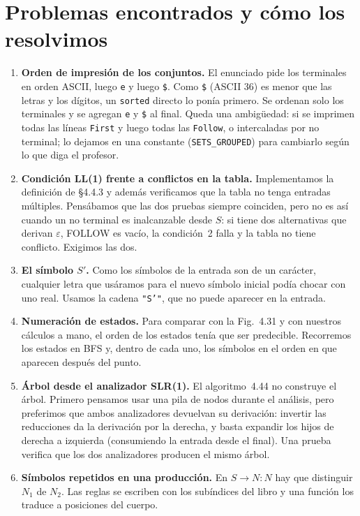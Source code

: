 \documentclass[11pt,a4paper]{article}
\newcommand{\eps}{\varepsilon}
\newcommand{\code}[1]{\texttt{#1}}
\begin{document}
\section{Problemas encontrados y cómo los resolvimos}
\begin{enumerate}
\item \textbf{Orden de impresión de los conjuntos.} El enunciado pide los terminales en orden
ASCII, luego \code{e} y luego \code{\$}. Como \code{\$} (ASCII 36) es menor que las letras y los
dígitos, un \code{sorted} directo lo ponía primero. Se ordenan solo los terminales y se agregan
\code{e} y \code{\$} al final. Queda una ambigüedad: si se imprimen todas las líneas
\code{First} y luego todas las \code{Follow}, o intercaladas por no terminal; lo dejamos en una
constante (\code{SETS\_GROUPED}) para cambiarlo según lo que diga el profesor.
\item \textbf{Condición LL(1) frente a conflictos en la tabla.} Implementamos la definición de
§4.4.3 y además verificamos que la tabla no tenga entradas múltiples. Pensábamos que las dos
pruebas siempre coinciden, pero no es así cuando un no terminal es inalcanzable desde $S$: si
tiene dos alternativas que derivan $\eps$, FOLLOW es vacío, la condición~2 falla y la tabla no
tiene conflicto. Exigimos las dos.
\item \textbf{El símbolo $S'$.} Como los símbolos de la entrada son de un carácter, cualquier
letra que usáramos para el nuevo símbolo inicial podía chocar con uno real. Usamos la cadena
\code{"S'"}, que no puede aparecer en la entrada.
\item \textbf{Numeración de estados.} Para comparar con la Fig.~4.31 y con nuestros cálculos a
mano, el orden de los estados tenía que ser predecible. Recorremos los estados en BFS y, dentro
de cada uno, los símbolos en el orden en que aparecen después del punto.
\item \textbf{Árbol desde el analizador SLR(1).} El algoritmo~4.44 no construye el árbol. Primero
pensamos usar una pila de nodos durante el análisis, pero preferimos que ambos analizadores
devuelvan su derivación: invertir las reducciones da la derivación por la derecha, y basta
expandir los hijos de derecha a izquierda (consumiendo la entrada desde el final). Una prueba
verifica que los dos analizadores producen el mismo árbol.
\item \textbf{Símbolos repetidos en una producción.} En $S \to N:N$ hay que distinguir
$N_1$ de $N_2$. Las reglas se escriben con los subíndices del libro y una función los traduce a
posiciones del cuerpo.

\end{enumerate}
\end{document}
